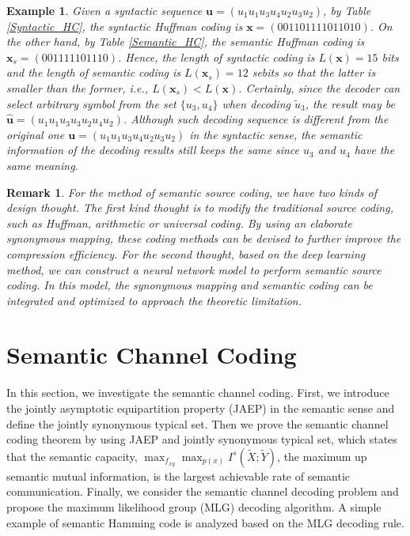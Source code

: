 \documentclass[12pt, draftclsnofoot,onecolumn]{IEEEtran}
\newtheorem{remark}{\bf{Remark}}
\newtheorem{example}{\bf{Example}}
\begin{document}
\begin{example}
Given a syntactic sequence $\mathbf{u}=(u_1u_1u_3u_4u_2u_3u_2)$, by Table \ref{Syntactic_HC}, the syntactic Huffman coding is $\mathbf{x}=(001101111011010)$. On the other hand, by Table \ref{Semantic_HC}, the semantic Huffman coding is $\mathbf{x}_s=(001111101110)$. Hence, the length of syntactic coding is $L(\mathbf{x})=15$ bits and the length of semantic coding is $L(\mathbf{x}_s)=12$ sebits so that the latter is smaller than the former, i.e., $L(\mathbf{x}_s)<L(\mathbf{x})$. Certainly, since the decoder can select arbitrary symbol from the set $\{u_3,u_4\}$ when decoding $\tilde{u}_3$, the result may be $\hat{\mathbf{u}}=(u_1u_1u_3u_3u_2u_4u_2)$. Although such decoding sequence is different from the original one $\mathbf{u}=(u_1u_1u_3u_4u_2u_3u_2)$ in the syntactic sense, the semantic information of the decoding results still keeps the same since $u_3$ and $u_4$ have the same meaning.
\end{example}

\begin{remark}
For the method of semantic source coding, we have two kinds of design thought. The first kind thought is to modify the traditional source coding, such as Huffman, arithmetic or universal coding. By using an elaborate synonymous mapping, these coding methods can be devised to further improve the compression efficiency. For the second thought, based on the deep learning method, we can construct a neural network model to perform semantic source coding. In this model, the synonymous mapping and semantic coding can be integrated and optimized to approach the theoretic limitation.
\end{remark}

\section{Semantic Channel Coding}
\label{section_VII}
In this section, we investigate the semantic channel coding. First, we introduce the jointly asymptotic equipartition property (JAEP) in the semantic sense and define the jointly synonymous typical set. Then we prove the semantic channel coding theorem by using JAEP and jointly synonymous typical set, which states that the semantic capacity, $\max_{f_{xy}}\max_{p(x)}I^s({\tilde{X};\tilde{Y}})$, the maximum up semantic mutual information, is the largest achievable rate of semantic communication. Finally, we consider the semantic channel decoding problem and propose the maximum likelihood group (MLG) decoding algorithm. A simple example of semantic Hamming code is analyzed based on the MLG decoding rule.
\end{document}

